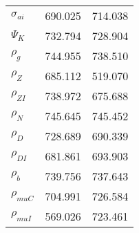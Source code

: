 \begin{center}
\begin{longtable}{lcc}
$ {\sigma_{ai}}        $	 & 	     690.025	 & 	     714.038 \\ 
$ {\Psi_{K}}           $	 & 	     732.794	 & 	     728.904 \\ 
$ {\rho_g}             $	 & 	     744.955	 & 	     738.510 \\ 
$ {\rho_Z}             $	 & 	     685.112	 & 	     519.070 \\ 
$ {\rho_{ZI}}          $	 & 	     738.972	 & 	     675.688 \\ 
$ {\rho_N}             $	 & 	     745.645	 & 	     745.452 \\ 
$ {\rho_D}             $	 & 	     728.689	 & 	     690.339 \\ 
$ {\rho_{DI}}          $	 & 	     681.861	 & 	     693.903 \\ 
$ {\rho_b}             $	 & 	     739.756	 & 	     737.643 \\ 
$ {\rho_{muC}}         $	 & 	     704.991	 & 	     726.584 \\ 
$ {\rho_{muI}}         $	 & 	     569.026	 & 	     723.461 \\ 
\end{longtable}
 \end{center}
